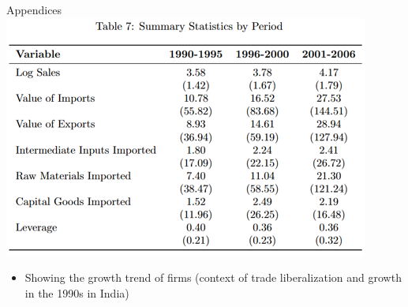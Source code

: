 \documentclass[
  xcolor=svgnames,
  bookmarks=true,
  bookmarksopen=true,
  pdfborder={0 0 0},
  pdfhighlight={/N},
  linkbordercolor={rgb}{0.5,0.5,0.5},
  implicit=false,
  colorlinks=true,
  allcolors=deepblue
]{beamer}
\begin{document}
\begin{frame}{Appendices}
\centering
    \includegraphics[height = 5 cm]{Summary stat time.png}
    \begin{itemize}
    \item Showing the growth trend of firms (context of trade liberalization and growth in the 1990s in India)
    \end{itemize}
\end{frame}
\end{document}

